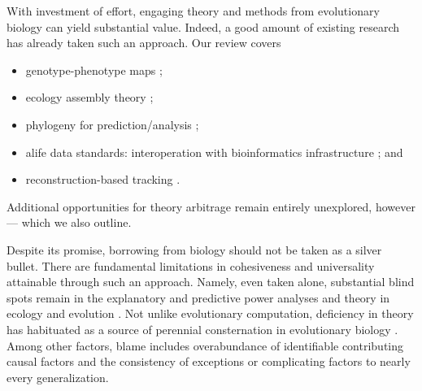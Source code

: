 With investment of effort, engaging theory and methods from evolutionary biology can yield substantial value.
Indeed, a good amount of existing research has already taken such an approach.
Our review covers
\begin{itemize}
  \item genotype-phenotype maps \citep{TODO};
  \item ecology assembly theory \citep{dolson2024reachability}; %
  \item phylogeny for prediction/analysis \citep{hernandez2022can,shahbandegan2022untangling,moreno2024ecology};
  \item alife data standards: interoperation with bioinformatics infrastructure \citep{lalejini2019data,moreno2024apc}; and
  \item reconstruction-based tracking \citep{moreno2022hstrat,moreno2024guide}.
\end{itemize}
Additional opportunities for theory arbitrage remain entirely unexplored, however --- which we also outline.


Despite its promise, borrowing from biology should not be taken as a silver bullet.
There are fundamental limitations in cohesiveness and universality attainable through such an approach.
Namely, even taken alone, substantial blind spots remain in the explanatory and predictive power analyses and theory in ecology and evolution \citep{TODO}.
Not unlike evolutionary computation, deficiency in theory has habituated as a source of perennial consternation in evolutionary biology \citep{welch2017wrong}.
Among other factors, blame includes overabundance of identifiable contributing causal factors and the consistency of exceptions or complicating factors to nearly every generalization.

